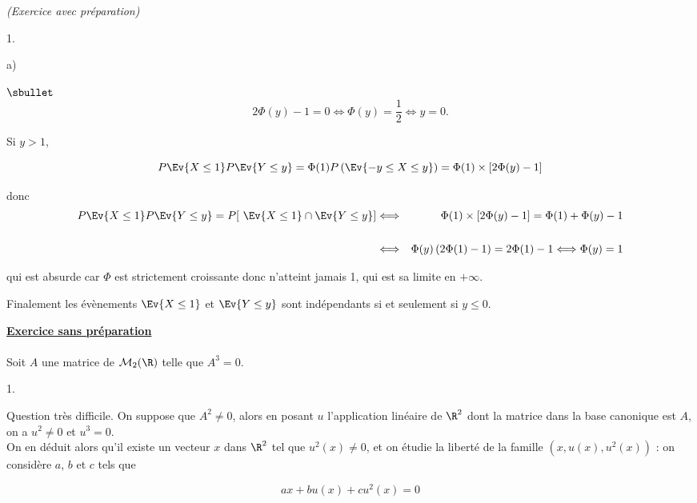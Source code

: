\documentclass[11pt]{article}%
\begin{document}
\begin{exercice}{\it (Exercice avec préparation)}
\begin{noliste}{1.}
\begin{noliste}{a)}
\begin{noliste}{$\sbullet$}
\[
 2 \Phi (y) - 1 = 0 \Longleftrightarrow \Phi (y) = \frac{ 1 }{ 2 }
\Longleftrightarrow y = 0. 
\]

 \item Si $y > 1$,
 
\[
 P \Ev{ X \leq 1 } P \Ev{ Y \leq y } = \Phi ( 1 ) P \left(\Ev{ - y \leq
X \leq y }\right) = \Phi (1) \times \left[ 2 \Phi (y) - 1 \right] 
\]

 donc
 \begin{eqnarray*}
 P \Ev{ X \leq 1 } P \Ev{ Y \leq y } = P [ \ \Ev{X \leq 1 } \cap \Ev{Y
\leq y } ] & \Longleftrightarrow & \Phi (1) \times \left[ 2 \Phi (y) -
1 \right] = \Phi (1) + \Phi ( y) - 1 \\
\\
 & \Longleftrightarrow & \Phi (y) \left( 2 \Phi (1) - 1 \right) = 2
\Phi (1) - 1 \Longleftrightarrow \Phi (y) = 1 
 \end{eqnarray*}

 qui est absurde car $\Phi$ est strictement croissante donc n'atteint
jamais 1, qui est sa limite en $ + \infty$.

 \end{noliste}

 Finalement les évènements $\Ev{X \leq 1}$ et $\Ev{Y \leq y}$ sont
indépendants si et seulement si $y \leq 0$.

 \end{noliste}

 \end{noliste}


 \indent

 \noindent \textbf{\underline{Exercice sans préparation}} \\
\\
 Soit $A$ une matrice de $\mathcal{M}_{2} (\R)$ telle que $A^{3} = 0$.
 \begin{noliste}{1.}
 \setlength{\itemsep}{4mm}

 \item Question très difficile. On suppose que $A^{2} \neq 0$, alors en
posant $u$ l'application linéaire de $\R^{2}$ dont la matrice dans la
base canonique est $A$, on a $u^{2} \neq 0$ et $u^{3} = 0$. \\

 On en déduit alors qu'il existe un vecteur $x$ dans $\R^{2}$ tel que
$u^{2} (x) \neq 0$, et on étudie la liberté de la famille $(x, u (x),
u^{2} (x) )$ : on considère $a$, $b$ et $c$ tels que 
 
\[
 a x + b u(x) + c u^{2} (x) = 0 
\]


\end{noliste}
\end{exercice}
\end{document}
